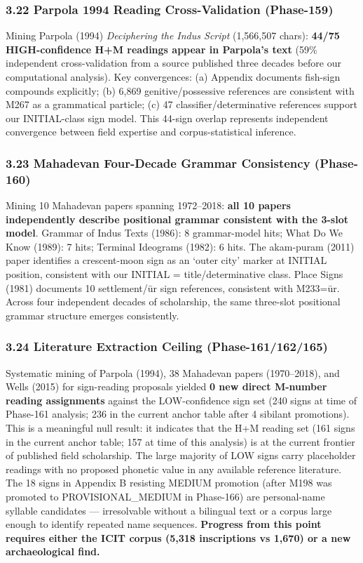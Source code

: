 \documentclass[
]{article}
\begin{document}
\subsubsection{3.22 Parpola 1994 Reading Cross-Validation
(Phase-159)}\label{parpola-1994-reading-cross-validation-phase-159}

Mining Parpola (1994) \emph{Deciphering the Indus Script} (1,566,507
chars): \textbf{44/75 HIGH-confidence H+M readings appear in Parpola's
text} (59\% independent cross-validation from a source published three
decades before our computational analysis). Key convergences: (a)
Appendix documents fish-sign compounds explicitly; (b) 6,869
genitive/possessive references are consistent with M267 as a grammatical particle; (c) 47 classifier/determinative references support our
INITIAL-class sign model. This 44-sign overlap represents independent
convergence between field expertise and corpus-statistical inference.

\subsubsection{3.23 Mahadevan Four-Decade Grammar Consistency
(Phase-160)}\label{mahadevan-four-decade-grammar-consistency-phase-160}

Mining 10 Mahadevan papers spanning 1972--2018: \textbf{all 10 papers
independently describe positional grammar consistent with the 3-slot
model}. Grammar of Indus Texts (1986): 8 grammar-model hits; What Do We
Know (1989): 7 hits; Terminal Ideograms (1982): 6 hits. The akam-puram
(2011) paper identifies a crescent-moon sign as an `outer city' marker
at INITIAL position, consistent with our INITIAL = title/determinative
class. Place Signs (1981) documents 10 settlement/ūr sign references,
consistent with M233=ūr. Across four independent decades of scholarship,
the same three-slot positional grammar structure emerges consistently.

\subsubsection{3.24 Literature Extraction Ceiling
(Phase-161/162/165)}\label{literature-extraction-ceiling-phase-161162165}

Systematic mining of Parpola (1994), 38 Mahadevan papers (1970--2018),
and Wells (2015) for sign-reading proposals yielded \textbf{0 new direct
M-number reading assignments} against the LOW-confidence sign set (240 signs at time of Phase-161 analysis; 236 in the current anchor table after 4 sibilant promotions). This
is a meaningful null result: it indicates that the H+M reading set (161 signs
in the current anchor table; 157 at time of this analysis) is at the current
frontier of published field scholarship. The large majority of LOW signs carry
placeholder readings with no proposed phonetic value in any available
reference literature. The 18 signs in Appendix B resisting MEDIUM promotion
(after M198 was promoted to PROVISIONAL\_MEDIUM in Phase-166) are
personal-name syllable candidates --- irresolvable without a bilingual text
or a corpus large enough to identify repeated name sequences.
\textbf{Progress from this point requires either the ICIT corpus (5,318
inscriptions vs 1,670) or a new archaeological find.}
\end{document}
